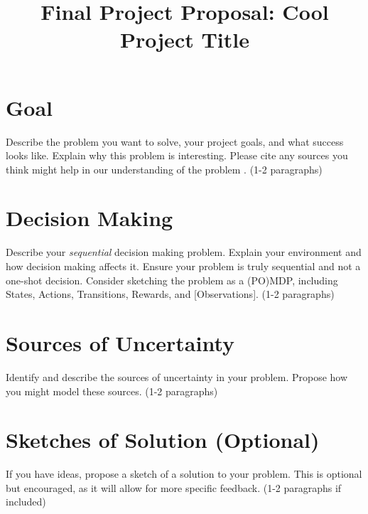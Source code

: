 \documentclass[twoside,11pt]{article}
\begin{document}
\title{Final Project Proposal: Cool Project Title}



\maketitle

\section{Goal}
Describe the problem you want to solve, your project goals, and what success looks like. Explain why this problem is interesting. Please cite any sources you think might help in our understanding of the problem \citep{Kochenderfer2022}. (1-2 paragraphs)


\section{Decision Making}
Describe your \textit{sequential} decision making problem. Explain your environment and how decision making affects it. Ensure your problem is truly sequential and not a one-shot decision. Consider sketching the problem as a (PO)MDP, including States, Actions, Transitions, Rewards, and [Observations]. (1-2 paragraphs)

\section{Sources of Uncertainty}
Identify and describe the sources of uncertainty in your problem. Propose how you might model these sources. (1-2 paragraphs)

\section{Sketches of Solution (Optional)}
If you have ideas, propose a sketch of a solution to your problem. This is optional but encouraged, as it will allow for more specific feedback. (1-2 paragraphs if included)


\end{document}
